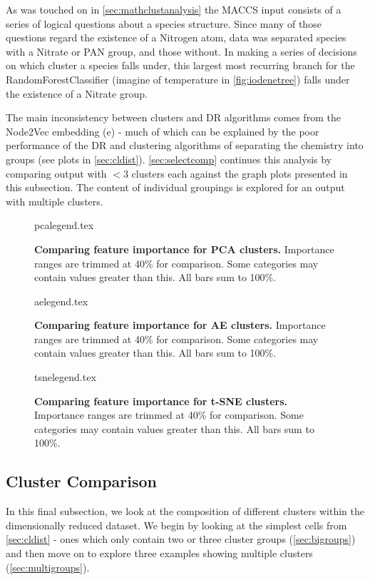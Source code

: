  As was touched on in \autoref{sec:mathclustanalysis} the MACCS input consists of a series of logical questions about a species structure. Since many of those questions regard the existence of a Nitrogen atom, data was separated species with a Nitrate or PAN group, and those without. In making a series of decisions on which cluster a species falls under, this largest most recurring branch for the RandomForestClassifier (imagine of temperature in \autoref{fig:iodenetree}) falls under the existence of a Nitrate group.

 The main inconsistency between clusters and DR algorithms comes from the Node2Vec embedding (e) - much of which can be explained by the poor performance of the DR and clustering algorithms of separating the chemistry into groups (see plots in \autoref{sec:cldist}). \autoref{sec:selectcomp} continues this analysis by comparing output with $<3$ clusters each against the graph plots presented in this subsection. The content of individual groupings is explored for an output with multiple clusters.


\begin{figure}[H]
    {pcalegend.tex}
    \caption{\textbf{Comparing feature importance for PCA clusters.} Importance ranges are trimmed at 40\% for comparison. Some categories may contain values greater than this. All bars sum to 100\%.}
    \label{fig:pcalegend}
\end{figure}
\begin{figure}[H]
    {aelegend.tex}
    \caption{\textbf{Comparing feature importance for AE clusters.} Importance ranges are trimmed at 40\% for comparison. Some categories may contain values greater than this. All bars sum to 100\%. }
    \label{fig:aelegend}
\end{figure}
\begin{figure}[H]
    {tsnelegend.tex}
    \caption{\textbf{Comparing feature importance for t-SNE clusters.} Importance ranges are trimmed at 40\% for comparison. Some categories may contain values greater than this. All bars sum to 100\%.}
    \label{fig:tsnelegend}
\end{figure}


\subsection{Cluster Comparison}\label{sec:selectcomp}

In this final subsection, we look at the composition of different clusters within the dimensionally reduced dataset. We begin by looking at the simplest cells from \autoref{sec:cldist} - ones which only contain two or three cluster groups (\autoref{sec:bigroups}) and then move on to explore three examples showing multiple clusters (\autoref{sec:multigroups}).



